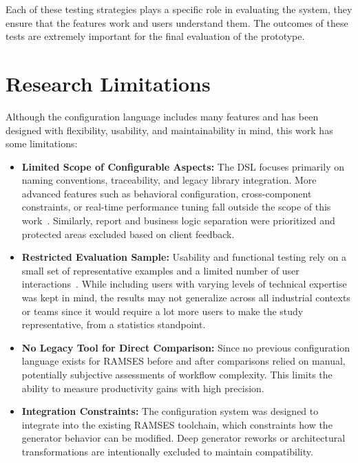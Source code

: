 Each of these testing strategies plays a specific role in evaluating the system, they ensure that the features work and users understand them. The outcomes of these tests are extremely important for the final evaluation of the prototype.

\section{Research Limitations}
\label{sec:research_limitations}

Although the configuration language includes many features and has been designed with flexibility, usability, and maintainability in mind, this work has some limitations:

\begin{itemize}
	\item \textbf{Limited Scope of Configurable Aspects:} The \gls{DSL} focuses primarily on naming conventions, traceability, and legacy library integration. More advanced features such as behavioral configuration, cross-component constraints, or real-time performance tuning fall outside the scope of this work~\cite{software_product_lines_practices_and_patterns_2015}. Similarly, report and business logic separation were prioritized and protected areas excluded based on client feedback.
	
	\item \textbf{Restricted Evaluation Sample:} Usability and functional testing rely on a small set of representative examples and a limited number of user interactions~\cite{Bias_Mayhew_1994}. While including users with varying levels of technical expertise was kept in mind, the results may not generalize across all industrial contexts or teams since it would require a lot more users to make the study representative, from a statistics standpoint.
	
	\item \textbf{No Legacy Tool for Direct Comparison:} Since no previous configuration language exists for \gls{RAMSES} before and after comparisons relied on manual, potentially subjective assessments of workflow complexity. This limits the ability to measure productivity gains with high precision.
	
	\item \textbf{Integration Constraints:} The configuration system was designed to integrate into the existing \gls{RAMSES} toolchain, which constraints how the generator behavior can be modified. Deep generator reworks or architectural transformations are intentionally excluded to maintain compatibility.
	

\end{itemize}

